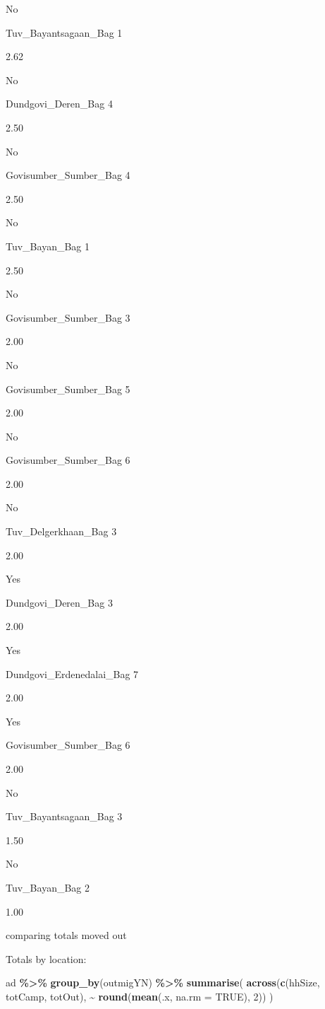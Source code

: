 \documentclass[
]{article}
\newenvironment{Shaded}{\begin{snugshade}}{\end{snugshade}}
\newcommand{\AttributeTok}[1]{\textcolor[rgb]{0.13,0.29,0.53}{#1}}
\newcommand{\ConstantTok}[1]{\textcolor[rgb]{0.56,0.35,0.01}{#1}}
\newcommand{\DecValTok}[1]{\textcolor[rgb]{0.00,0.00,0.81}{#1}}
\newcommand{\FunctionTok}[1]{\textcolor[rgb]{0.13,0.29,0.53}{\textbf{#1}}}
\newcommand{\NormalTok}[1]{#1}
\newcommand{\SpecialCharTok}[1]{\textcolor[rgb]{0.81,0.36,0.00}{\textbf{#1}}}
\begin{document}
No

Tuv\_Bayantsagaan\_Bag 1

2.62

No

Dundgovi\_Deren\_Bag 4

2.50

No

Govisumber\_Sumber\_Bag 4

2.50

No

Tuv\_Bayan\_Bag 1

2.50

No

Govisumber\_Sumber\_Bag 3

2.00

No

Govisumber\_Sumber\_Bag 5

2.00

No

Govisumber\_Sumber\_Bag 6

2.00

No

Tuv\_Delgerkhaan\_Bag 3

2.00

Yes

Dundgovi\_Deren\_Bag 3

2.00

Yes

Dundgovi\_Erdenedalai\_Bag 7

2.00

Yes

Govisumber\_Sumber\_Bag 6

2.00

No

Tuv\_Bayantsagaan\_Bag 3

1.50

No

Tuv\_Bayan\_Bag 2

1.00

comparing totals moved out

Totals by location:

\begin{Shaded}
\begin{Highlighting}[]
\NormalTok{ad }\SpecialCharTok{\%\textgreater{}\%} 
  \FunctionTok{group\_by}\NormalTok{(outmigYN) }\SpecialCharTok{\%\textgreater{}\%}
  \FunctionTok{summarise}\NormalTok{(}
    \FunctionTok{across}\NormalTok{(}\FunctionTok{c}\NormalTok{(hhSize, totCamp, totOut), }\SpecialCharTok{\textasciitilde{}} \FunctionTok{round}\NormalTok{(}\FunctionTok{mean}\NormalTok{(.x, }\AttributeTok{na.rm =} \ConstantTok{TRUE}\NormalTok{), }\DecValTok{2}\NormalTok{))}
\NormalTok{  ) }
\end{Highlighting}
\end{Shaded}
\end{document}
